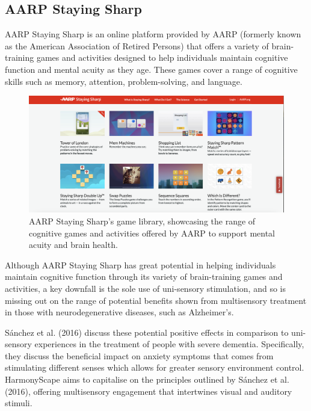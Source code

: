\documentclass{l4proj}
\begin{document}
\subsection{AARP Staying Sharp}
AARP Staying Sharp is an online platform provided by AARP (formerly known as the American Association of Retired Persons) that offers a variety of brain-training games and activities designed to help individuals maintain cognitive function and mental acuity as they age. These games cover a range of cognitive skills such as memory, attention, problem-solving, and language.

\begin{figure}[h]
    \centering
    \includegraphics[width=0.8\linewidth]{images/AARP_Staying_Sharp.png}    

    \caption{AARP Staying Sharp's game library, showcasing the range of cognitive games and activities offered by AARP to support mental acuity and brain health.
    }

    \label{fig:aarp} 
\end{figure}

Although AARP Staying Sharp has great potential in helping individuals maintain cognitive function through its variety of brain-training games and activities, a key downfall is the sole use of uni-sensory stimulation, and so is missing out on the range of potential benefits shown from multisensory treatment in those with neurodegenerative diseases, such as Alzheimer's.

Sánchez et al. (2016) discuss these potential positive effects in comparison to uni-sensory experiences in the treatment of people with severe dementia. Specifically, they discuss the beneficial impact on anxiety symptoms that comes from stimulating different senses which allows for greater sensory environment control. HarmonyScape aims to capitalise on the principles outlined by Sánchez et al. (2016), offering multisensory engagement that intertwines visual and auditory stimuli.
\end{document}

